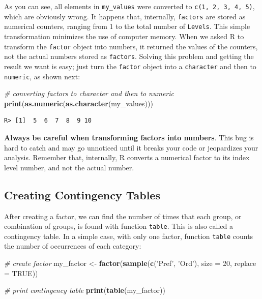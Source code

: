 \documentclass[
  12pt,
]{book}
\newenvironment{Shaded}{\begin{snugshade}}{\end{snugshade}}
\newcommand{\CommentTok}[1]{\textcolor[rgb]{0.37,0.37,0.37}{\textit{#1}}}
\newcommand{\DataTypeTok}[1]{\textcolor[rgb]{0.27,0.27,0.27}{#1}}
\newcommand{\DecValTok}[1]{\textcolor[rgb]{0.06,0.06,0.06}{#1}}
\newcommand{\KeywordTok}[1]{\textcolor[rgb]{0.27,0.27,0.27}{\textbf{#1}}}
\newcommand{\NormalTok}[1]{#1}
\newcommand{\OtherTok}[1]{\textcolor[rgb]{0.37,0.37,0.37}{#1}}
\newcommand{\StringTok}[1]{\textcolor[rgb]{0.5,0.5,0.5}{#1}}
\newenvironment{rmdcaution}
{\begin{cautionblock}
		
	} {\end{cautionblock}}
\begin{document}
As you can see, all elements in \texttt{my\_values} were converted to \texttt{c(1,\ 2,\ 3,\ 4,\ 5)}, which are obviously wrong. It happens that, internally, \texttt{factors} are stored as numerical counters, ranging from 1 to the total number of \texttt{Levels}. This simple transformation minimizes the use of computer memory. When we asked R to transform the \texttt{factor} object into numbers, it returned the values of the counters, not the actual numbers stored as \texttt{factors}. Solving this problem and getting the result we want is easy; just turn the \texttt{factor} object into a \texttt{character} and then to \texttt{numeric}, as shown next:

\begin{Shaded}
\begin{Highlighting}[]
\CommentTok{# converting factors to character and then to numeric}
\KeywordTok{print}\NormalTok{(}\KeywordTok{as.numeric}\NormalTok{(}\KeywordTok{as.character}\NormalTok{(my_values)))}
\end{Highlighting}
\end{Shaded}

\begin{verbatim}
R> [1]  5  6  7  8  9 10
\end{verbatim}

\begin{rmdcaution}
\textbf{Always be careful when transforming factors into numbers}. This
bug is hard to catch and may go unnoticed until it breaks your code or
jeopardizes your analysis. Remember that, internally, R converts a
numerical factor to its index level number, and not the actual number.
\end{rmdcaution}

\hypertarget{creating-contingency-tables}{%
\subsection{Creating Contingency Tables}\label{creating-contingency-tables}}

After creating a factor, we can find the number of times that each group, or combination of groups, is found with function \texttt{table}. This is also called a contingency table. In a simple case, with only one factor, function \texttt{table} counts the number of occurrences of each category: 

\begin{Shaded}
\begin{Highlighting}[]
\CommentTok{# create factor}
\NormalTok{my_factor <-}\StringTok{ }\KeywordTok{factor}\NormalTok{(}\KeywordTok{sample}\NormalTok{(}\KeywordTok{c}\NormalTok{(}\StringTok{'Pref'}\NormalTok{, }\StringTok{'Ord'}\NormalTok{),}
                           \DataTypeTok{size =} \DecValTok{20}\NormalTok{,}
                           \DataTypeTok{replace =} \OtherTok{TRUE}\NormalTok{))}

\CommentTok{# print contingency table}
\KeywordTok{print}\NormalTok{(}\KeywordTok{table}\NormalTok{(my_factor))}
\end{Highlighting}
\end{Shaded}
\end{document}

